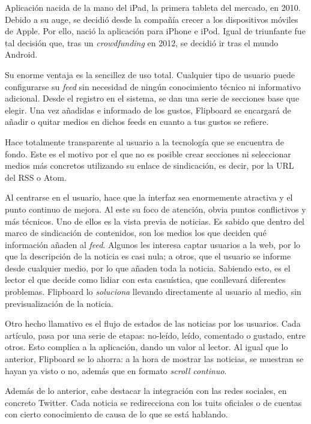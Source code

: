 Aplicación nacida de la mano del iPad, la primera tableta del mercado, en 2010. Debido a su auge, se decidió desde la compañía crecer a los dispositivos móviles de Apple. Por ello, nació la aplicación para iPhone e iPod. Igual de triunfante fue tal decisión que, tras un \textit{crowdfunding} en 2012, se decidió ir tras el mundo Android.


Su enorme ventaja es la sencillez de uso total. Cualquier tipo de usuario puede configurarse su \textit{feed} sin necesidad de ningún conocimiento técnico ni informativo adicional. Desde el registro en el sistema, se dan una serie de secciones base que elegir. Una vez añadidas e informado de los gustos, Flipboard se encargará de añadir o quitar medios en dichos feeds en cuanto a tus gustos se refiere.

Hace totalmente transparente al usuario a la tecnología que se encuentra de fondo. Este es el motivo por el que no es posible crear secciones ni seleccionar medios más concretos utilizando su enlace de sindicación, es decir, por la URL del RSS o Atom.

Al centrarse en el usuario, hace que la interfaz sea enormemente atractiva y el punto continuo de mejora. Al este su foco de atención, obvia puntos conflictivos y más técnicos. Uno de ellos es la vista previa de noticias. Es sabido que dentro del marco de sindicación de contenidos, son los medios los que deciden qué información añaden al \textit{feed}. Algunos les interesa captar usuarios a la web, por lo que la descripción de la noticia es casi nula; a otros, que el usuario se informe desde cualquier medio, por lo que añaden toda la noticia. Sabiendo esto, es el lector el que decide como lidiar con esta casuística, que conllevará diferentes problemas. Flipboard lo \textit{soluciona} llevando directamente al usuario al medio, sin previsualización de la noticia.

Otro hecho llamativo es el flujo de estados de las noticias por los usuarios. Cada artículo, pasa por una serie de etapas: no-leído, leído, comentado o gustado, entre otros. Esto complica a la aplicación, dando un valor al lector. Al igual que lo anterior, Flipboard se lo ahorra: a la hora de mostrar las noticias, se muestran se hayan ya visto o no, además que en formato \textit{scroll continuo}.

Además de lo anterior, cabe destacar la integración con las redes sociales, en concreto Twitter. Cada noticia se redirecciona con los tuits oficiales o de cuentas con cierto conocimiento de causa de lo que se está hablando.

